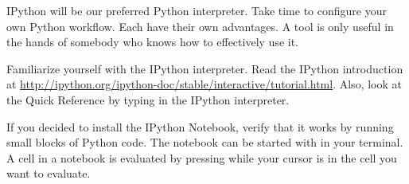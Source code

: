 IPython will be our preferred Python interpreter.  Take time to configure your own Python
workflow.  Each have their own advantages.  A tool is only useful in the hands of somebody
who knows how to effectively use it.
\begin{problem}
Familiarize yourself with the IPython interpreter.
Read the IPython introduction at \url{http://ipython.org/ipython-doc/stable/interactive/tutorial.html}.
Also, look at the Quick Reference by typing  in the IPython interpreter.

If you decided to install the IPython Notebook, verify that it works by running small blocks of Python code.
The notebook can be started with  in your terminal.
A cell in a notebook is evaluated by pressing  while your cursor is in the cell you want to evaluate.
\end{problem}
